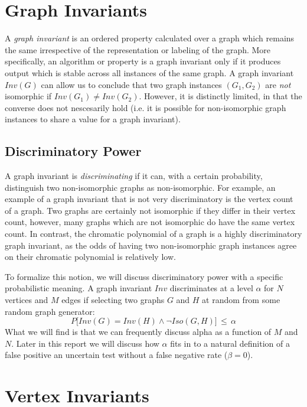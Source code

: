 \section{Graph Invariants}
A \emph{graph invariant} is an ordered property calculated over a graph which remains the same irrespective of the representation or labeling of the graph.
More specifically, an algorithm or property is a graph invariant only if it produces output which is stable across all instances of the same graph.
A graph invariant $Inv(G)$ can allow us to conclude that two graph instances $(G_1, G_2)$ are \emph{not} isomorphic if $Inv(G_1) \neq Inv(G_2)$.
However, it is distinctly limited, in that the converse does not nescesarily hold (i.e. it is possible for non-isomorphic graph instances to share a value for a graph invariant).


\subsection{Discriminatory Power}
A graph invariant is \emph{discriminating} if it can, with a certain probability, distinguish two non-isomorphic graphs as non-isomorphic.
For example, an example of a graph invariant that is not very discriminatory is the vertex count of a graph.
Two graphs are certainly not isomorphic if they differ in their vertex count, however, many graphs which are not isomorphic do have the same vertex count.
In contrast, the chromatic polynomial of a graph is a highly discriminatory graph invariant, as the odds of having two non-isomorphic graph instances agree on their chromatic polynomial is relatively low.

To formalize this notion, we will discuss discriminatory power with a specific probabilistic meaning.
A graph invariant $Inv$ discriminates at a level $\alpha$ for $N$ vertices and $M$ edges if selecting two graphs $G$ and $H$ at random from some random graph generator:
$$P \big[ Inv(G) = Inv(H) \wedge \neg Iso(G, H) \big] \, \leq \, \alpha$$
What we will find is that we can frequently discuss alpha as a function of $M$ and $N$.
Later in this report we will discuss how $\alpha$ fits in to a natural definition of a false positive an uncertain test without a false negative rate ($\beta = 0$).



\section{Vertex Invariants}



